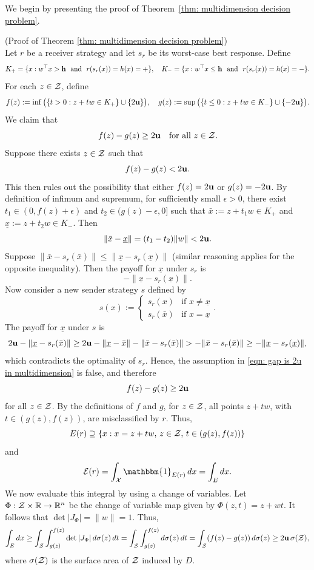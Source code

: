 We begin by presenting the proof of Theorem~\ref{thm: multidimension decision problem}.

\begin{apdxproof}{(Proof of Theorem \ref{thm: multidimension decision problem})}\label{proof: multidemnsional decision}\\
Let $r$ be a receiver strategy and let $s_r$ be its worst-case best response. Define
\[
K_+ = \{x : w^\top x > \mathbf{h}\ \text{ and }\ r(s_r(x)) = h(x) = \mathbf{+}\}, \quad 
K_- = \{x : w^\top x \leq \mathbf{h}\ \text{ and }\ r(s_r(x)) = h(x) = \mathbf{-}\}.
\]
For each $z \in \mathcal{Z}$, define
\[
f(z) := \inf \big(\{t > 0 : z + tw \in K_+\} \cup \{2\mathbf{u}\}\big), \quad
g(z) := \sup \big(\{t \leq 0 : z + tw \in K_-\} \cup \{-2\mathbf{u}\}\big).
\]
We claim that
\[
f(z) - g(z) \geq 2\mathbf{u} \quad \text{for all } z \in \mathcal{Z}.
\]
Suppose there exists $z \in \mathcal{Z}$ such that
\begin{equation}\label{eqn: gap is 2u in multidimension}
    f(z) - g(z) < 2\mathbf{u}.
\end{equation}
This then rules out the possibility that either $f(z) = 2\mathbf{u}$ or $g(z) = -2\mathbf{u}$.
By definition of infimum and supremum, for sufficiently small $\epsilon > 0$, there exist $t_1 \in (0, f(z) + \epsilon)$ and $t_2 \in (g(z) - \epsilon, 0]$ such that $\bar{x} := z + t_1 w \in K_+$ and $\underline{x} := z + t_2 w \in K_-$.
Then
\[
\|\bar{x} - \underline{x}\| = (t_1 - t_2)\|w\| < 2\mathbf{u}.
\]
Suppose $\|\bar{x} - s_r(\bar{x})\| \leq \|\underline{x} - s_r(\underline{x})\|$ (similar reasoning applies for the opposite inequality).
Then the payoff for $\underline{x}$ under $s_r$ is
\[
- \|\underline{x} - s_r(\underline{x})\|.
\]
Now consider a new sender strategy $s$ defined by
\[
s(x) := 
\begin{cases}
s_r(x) & \text{if } x \neq \underline{x} \\
s_r(\bar{x}) & \text{if } x = \underline{x}
\end{cases}.
\]
The payoff for $\underline{x}$ under $s$ is
\[
2\mathbf{u} - \|\underline{x} - s_r(\bar{x})\| \geq 2\mathbf{u} - \|\underline{x} - \bar{x}\| - \|\bar{x} - s_r(\bar{x})\| > -\|\bar{x} - s_r(\bar{x})\| \geq -\|\underline{x} - s_r(\underline{x})\|,
\]
which contradicts the optimality of $s_r$. Hence, the assumption in \eqref{eqn: gap is 2u in multidimension} is false, and therefore
\[
f(z) - g(z) \geq 2\mathbf{u} 
\]
for all $z \in \mathcal{Z}$.
By the definitions of $f$ and $g$, for $z \in \mathcal{Z}$, all points $z + tw$, with $t \in (g(z), f(z))$, are misclassified by $r$. Thus,
\[
E(r) \supseteq \{x: x = z + tw,\, z \in \mathcal{Z},\, t \in (g(z),f(z))\}
\]
and 
\[
\cg{E}(r) = \int_{\cg{X}}\mathbbm{1}_{E(r)}\,dx = \int_{E}dx.
\]
We now evaluate this integral by using a change of variables. Let $\Phi: \mathcal{Z} \times \mathbb{R} \rightarrow \mathbb{R}^n$ be the change of variable map given by $\Phi(z,t) = z + wt$. It follows that $\det|J_\Phi| = \|w\| = 1$. Thus,
\[
\int_E dx \geq \int_{\mathcal{Z}}\int_{g(z)}^{f(z)} \det|J_{\Phi}|\,d\sigma(z)\, dt = \int_{\mathcal{Z}}\int_{g(z)}^{f(z)} d\sigma(z)\,dt = \int_{\mathcal{Z}}(f(z) - g(z))\, d\sigma(z) \geq 2\mathbf{u}\,\sigma(\mathcal{Z}),
\]
where $\sigma(\mathcal{Z})$ is the surface area of $\mathcal{Z}$ induced by $D$.
\end{apdxproof}

